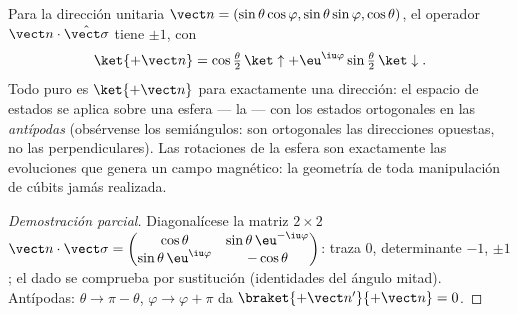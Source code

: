 \begin{proposition}\label{prop:b3:spin-two-level:bloch}
Para la dirección unitaria $\vect n = (\sin\theta\cos\varphi,
\sin\theta\sin\varphi, \cos\theta)$, el operador $\vect
n\cdot\hat{\vect\sigma}$ tiene  $\pm1$, con
\[
\ket{+\vect n} = \cos\tfrac\theta2\,\ket\uparrow +
\eu^{\iu\varphi}\sin\tfrac\theta2\,\ket\downarrow .
\]
Todo  puro es $\ket{+\vect n}$ para exactamente una dirección: el
espacio de estados se aplica sobre una esfera --- la \emph{}
--- con los estados ortogonales en las \emph{antípodas} (obsérvense los
semiángulos: son ortogonales las direcciones opuestas, no las
perpendiculares). Las rotaciones de la esfera son exactamente las
evoluciones que genera un campo magnético: la geometría de toda manipulación
de cúbits jamás realizada.
\end{proposition}

\begin{proof}[Demostración parcial]
Diagonalícese la matriz $2\times2$ $\vect n\cdot\vect\sigma =
\begin{pmatrix}\cos\theta & \sin\theta\,\eu^{-\iu\varphi}\\
\sin\theta\,\eu^{\iu\varphi} & -\cos\theta\end{pmatrix}$: traza $0$,
determinante $-1$,  $\pm1$; el  dado se comprueba por
sustitución (identidades del ángulo mitad). Antípodas: $\theta \to \pi -
\theta$, $\varphi \to \varphi + \pi$ da $\braket{+\vect
n'}{+\vect n} = 0$.
\end{proof}

